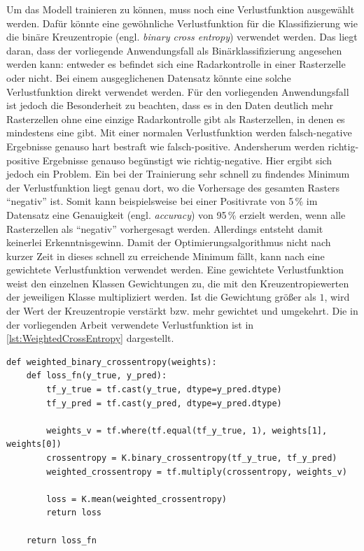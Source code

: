 Um das Modell trainieren zu können, muss noch eine Verlustfunktion ausgewählt werden.
Dafür könnte eine gewöhnliche Verlustfunktion für die Klassifizierung wie die binäre Kreuzentropie (engl. \emph{binary cross entropy}) verwendet werden.
Das liegt daran, dass der vorliegende Anwendungsfall als Binärklassifizierung angesehen werden kann: entweder es befindet sich eine Radarkontrolle in einer Rasterzelle oder nicht.
Bei einem ausgeglichenen Datensatz könnte eine solche Verlustfunktion direkt verwendet werden.
Für den vorliegenden Anwendungsfall ist jedoch die Besonderheit zu beachten, dass es in den Daten deutlich mehr Rasterzellen ohne eine einzige Radarkontrolle gibt als Rasterzellen, in denen es mindestens eine gibt.
Mit einer normalen Verlustfunktion werden falsch-negative Ergebnisse genauso hart bestraft wie falsch-positive.
Andersherum werden richtig-positive Ergebnisse genauso begünstigt wie richtig-negative.
Hier ergibt sich jedoch ein Problem.
Ein bei der Trainierung sehr schnell zu findendes Minimum der Verlustfunktion liegt genau dort, wo die Vorhersage des gesamten Rasters "`negativ"' ist.
Somit kann beispielsweise bei einer Positivrate von 5\,\% im Datensatz eine Genauigkeit (engl. \emph{accuracy}) von 95\,\% erzielt werden, wenn alle Rasterzellen als "`negativ"' vorhergesagt werden.
Allerdings entsteht damit keinerlei Erkenntnisgewinn.
Damit der Optimierungsalgorithmus nicht nach kurzer Zeit in dieses schnell zu erreichende Minimum fällt, kann nach \cite{CrimeConvLSTM} eine gewichtete Verlustfunktion verwendet werden.
Eine gewichtete Verlustfunktion weist den einzelnen Klassen Gewichtungen zu, die mit den Kreuzentropiewerten der jeweiligen Klasse multipliziert werden.
Ist die Gewichtung größer als $1$, wird der Wert der Kreuzentropie verstärkt bzw. mehr gewichtet und umgekehrt.
Die in der vorliegenden Arbeit verwendete Verlustfunktion ist in \autoref{lst:WeightedCrossEntropy} dargestellt.

\begin{minipage}{\textwidth}
\begin{code}
\begin{verbatim}
def weighted_binary_crossentropy(weights):
    def loss_fn(y_true, y_pred):
        tf_y_true = tf.cast(y_true, dtype=y_pred.dtype)
        tf_y_pred = tf.cast(y_pred, dtype=y_pred.dtype)

        weights_v = tf.where(tf.equal(tf_y_true, 1), weights[1], weights[0])
        crossentropy = K.binary_crossentropy(tf_y_true, tf_y_pred)
        weighted_crossentropy = tf.multiply(crossentropy, weights_v)

        loss = K.mean(weighted_crossentropy)
        return loss

    return loss_fn
\end{verbatim}
\label{lst:WeightedCrossEntropy}
\end{code}
\end{minipage}

